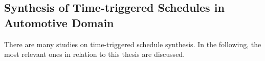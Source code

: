   
    

\subsection{Synthesis of Time-triggered Schedules in Automotive Domain}\label{TT_relatedwork}

There are many studies on time-triggered schedule synthesis. In the following, the most relevant ones in relation to this thesis are discussed. 

